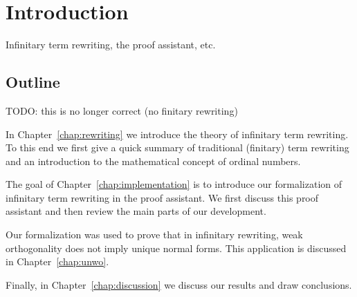 \chapter{Introduction}

Infinitary term rewriting, the \Coq proof assistant, etc.


\section*{Outline}

TODO: this is no longer correct (no finitary rewriting)

In Chapter~\ref{chap:rewriting} we introduce the theory of infinitary term
rewriting. To this end we first give a quick summary of traditional (finitary)
term rewriting and an introduction to the mathematical concept of ordinal
numbers.

The goal of Chapter~\ref{chap:implementation} is to introduce our formalization
of infinitary term rewriting in the \Coq proof assistant. We first discuss this
proof assistant and then review the main parts of our development.

Our formalization was used to prove that in infinitary rewriting, weak
orthogonality does not imply unique normal forms. This application is
discussed in Chapter~\ref{chap:unwo}.

Finally, in Chapter~\ref{chap:discussion} we discuss our results and draw
conclusions.
